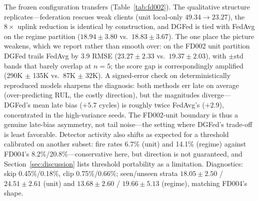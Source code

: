 \documentclass[journal]{IEEEtran}
\newcommand{\dgfed}{DGFed}
\begin{document}
The frozen configuration transfers (Table~\ref{tab:fd002}). The qualitative structure replicates---federation rescues weak clients (unit local-only $49.34 \to 23.27$), the $8\times$ uplink reduction is identical by construction, and \dgfed{} is tied with FedAvg on the regime partition ($18.94 \pm 3.80$ vs.\ $18.83 \pm 3.67$). The one place the picture weakens, which we report rather than smooth over: on the FD002 unit partition \dgfed{} trails FedAvg by 3.9 RMSE ($23.27 \pm 2.33$ vs.\ $19.37 \pm 2.03$), with $\pm$std bands that barely overlap at $n = 5$; the score gap is correspondingly amplified (290K $\pm$ 135K vs.\ 87K $\pm$ 32K). A signed-error check on deterministically reproduced models sharpens the diagnosis: both methods err late on average (over-predicting RUL, the costly direction), but the magnitudes diverge---\dgfed{}'s mean late bias ($+5.7$ cycles) is roughly twice FedAvg's ($+2.9$), concentrated in the high-variance seeds. The FD002-unit boundary is thus a genuine late-bias asymmetry, not tail noise---the setting where \dgfed{}'s trade-off is least favorable. Detector activity also shifts as expected for a threshold calibrated on another subset: fire rates 6.7\% (unit) and 14.1\% (regime) against FD004's 8.2\%/20.8\%---conservative here, but direction is not guaranteed, and Section~\ref{sec:discussion} lists threshold portability as a limitation. Diagnostics: skip 0.45\%/0.18\%, clip 0.75\%/0.66\%; seen/unseen strata $18.05 \pm 2.50$ / $24.51 \pm 2.61$ (unit) and $13.68 \pm 2.60$ / $19.66 \pm 5.13$ (regime), matching FD004's shape.
\end{document}
